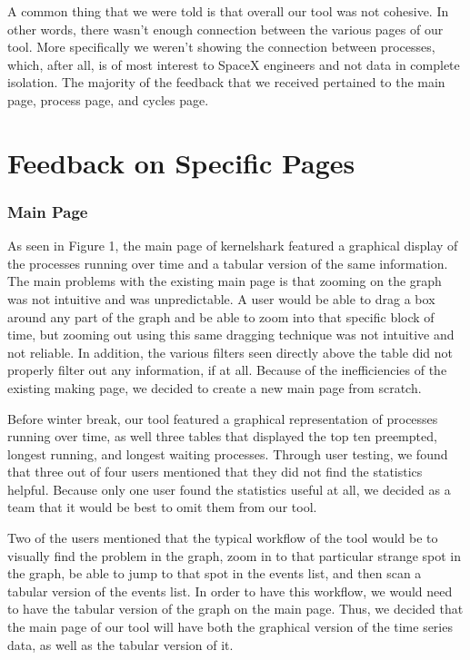 \documentclass{hmcclinic}
\begin{document}
A common thing that we were told is that overall our tool was not cohesive. In other words, there wasn't enough connection between the various pages of our tool. More specifically we weren't showing the connection between processes, which, after all, is of most interest to SpaceX engineers and not data in complete isolation. The majority of the feedback that we received pertained to the main page, process page, and cycles page.

\section{Feedback on Specific Pages} %

\subsubsection{Main Page}

As seen in Figure 1, the main page of kernelshark featured a graphical display of the processes running over time and a tabular version of the same information. The main problems with the existing main page is that zooming on the graph was not intuitive and was unpredictable. A user would be able to drag a box around any part of the graph and be able to zoom into that specific block of time, but zooming out using this same dragging technique was not intuitive and not reliable. In addition, the various filters seen directly above the table did not properly filter out any information, if at all. Because of the inefficiencies of the existing making page, we decided to create a new main page from scratch. 

Before winter break, our tool featured a graphical representation of processes running over time, as well three tables that displayed the top ten preempted, longest running, and longest waiting processes. Through user testing, we found that three out of four users mentioned that they did not find the statistics helpful. Because only one user found the statistics useful at all, we decided as a team that it would be best to omit them from our tool.

Two of the users mentioned that the typical workflow of the tool would be to visually find the problem in the graph, zoom in to that particular strange spot in the graph, be able to jump to that spot in the events list, and then scan a tabular version of the events list. In order to have this workflow, we would need to have the tabular version of the graph on the main page. Thus, we decided that the main page of our tool will have both the graphical version of the time series data, as well as the tabular version of it.
\end{document}
